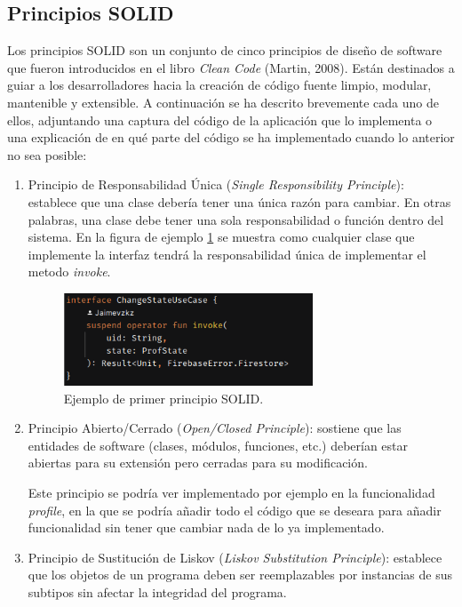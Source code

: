 \subsection{Principios SOLID}
\label{subsec:solid}
Los principios SOLID son un conjunto de cinco principios de diseño de software que fueron introducidos en el libro \textit{Clean Code} (Martin, 2008)\hyperlink{cap:biblio}{}. Están destinados a guiar a los desarrolladores hacia la creación de código fuente limpio, modular, mantenible y extensible. A continuación se ha descrito brevemente cada uno de ellos, adjuntando una captura del código de la aplicación que lo implementa o una explicación de en qué parte del código se ha implementado cuando lo anterior no sea posible:
\begin{enumerate}
    \item Principio de Responsabilidad Única (\textit{Single Responsibility Principle}): establece que una clase debería tener una única razón para cambiar. En otras palabras, una clase debe tener una sola responsabilidad o función dentro del sistema. En la figura de ejemplo \ref{fig:change_state} se muestra como cualquier clase que implemente la interfaz tendrá la responsabilidad única de implementar el metodo \textit{invoke}.
    \begin{figure}[h]
        \centering
        \includegraphics[width = 0.7\textwidth]{Imagenes/Fuentes/change_state.png}
        \caption{Ejemplo de primer principio SOLID.}
        \label{fig:change_state}
    \end{figure}
    \item Principio Abierto/Cerrado (\textit{Open/Closed Principle}): sostiene que las entidades de software (clases, módulos, funciones, etc.) deberían estar abiertas para su extensión pero cerradas para su modificación.
    
    Este principio se podría ver implementado por ejemplo en la funcionalidad \textit{profile}, en la que se podría añadir todo el código que se deseara para añadir funcionalidad sin tener que cambiar nada de lo ya implementado.
    \item Principio de Sustitución de Liskov (\textit{Liskov Substitution Principle}): establece que los objetos de un programa deben ser reemplazables por instancias de sus subtipos sin afectar la integridad del programa.
    

\end{enumerate}
